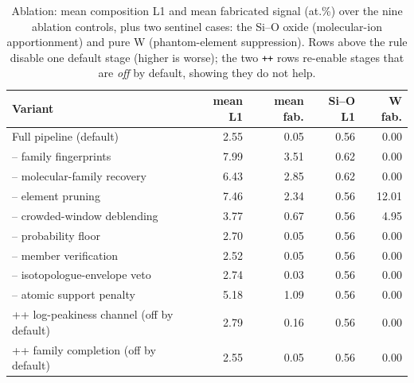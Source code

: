 \begin{table}[t]
\centering
\caption{Ablation: mean composition L1 and mean fabricated signal
(at.\%) over the nine ablation controls, plus two sentinel cases:
the Si--O oxide (molecular-ion apportionment) and pure W
(phantom-element suppression). Rows above the rule disable one
default stage (higher is worse); the two \texttt{++} rows re-enable
stages that are \emph{off} by default, showing they do not help.}
\label{tab:ablation}
\small
\begin{tabular}{lrrrr}
\toprule
Variant & mean L1 & mean fab. & Si--O L1 & W fab. \\
\midrule
Full pipeline (default) & 2.55 & 0.05 & 0.56 & 0.00 \\
-- family fingerprints & 7.99 & 3.51 & 0.62 & 0.00 \\
-- molecular-family recovery & 6.43 & 2.85 & 0.62 & 0.00 \\
-- element pruning & 7.46 & 2.34 & 0.56 & 12.01 \\
-- crowded-window deblending & 3.77 & 0.67 & 0.56 & 4.95 \\
-- probability floor & 2.70 & 0.05 & 0.56 & 0.00 \\
-- member verification & 2.52 & 0.05 & 0.56 & 0.00 \\
-- isotopologue-envelope veto & 2.74 & 0.03 & 0.56 & 0.00 \\
-- atomic support penalty & 5.18 & 1.09 & 0.56 & 0.00 \\
\addlinespace
++ log-peakiness channel (off by default) & 2.79 & 0.16 & 0.56 & 0.00 \\
++ family completion (off by default) & 2.55 & 0.05 & 0.56 & 0.00 \\
\bottomrule
\end{tabular}
\end{table}
